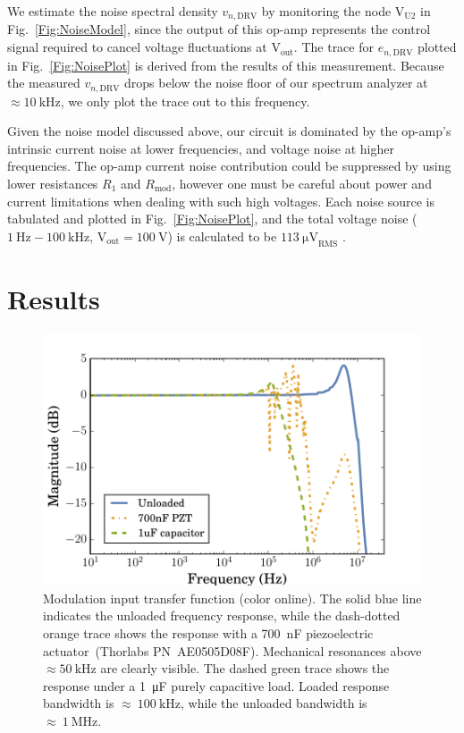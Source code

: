 \documentclass[aip,rsi,reprint]{revtex4-1} %
\begin{document}
We estimate the noise spectral density $v_{n,\text{DRV}}$ by monitoring the node $\text{V}_\text{U2}$ in Fig.~\ref{Fig:NoiseModel}, since the output of this op-amp represents the control signal required to cancel voltage fluctuations at $\text{V}_\text{out}$.
The trace for $e_{n,\text{DRV}}$ plotted in Fig.~\ref{Fig:NoisePlot} is derived from the results of this measurement.
Because the measured $v_{n,\text{DRV}}$ drops below the noise floor of our spectrum analyzer at $\approx \SI{10}{\kilo\hertz}$, we only plot the trace out to this frequency.

Given the noise model discussed above, our circuit is dominated by the op-amp's intrinsic current noise at lower frequencies, and voltage noise at higher frequencies.
The op-amp current noise contribution could be suppressed by using lower resistances $R_1$ and $R_\text{mod}$, however one must be careful about power and current limitations when dealing with such high voltages.
Each noise source is tabulated and plotted in Fig.~\ref{Fig:NoisePlot}, and the total voltage noise ($\SI{1}{\hertz} - \SI{100}{\kilo\hertz}$, $\text{V}_\text{out} = \SI{100}{\volt}$) is calculated to be $\SI{113}{\micro\volt}_\text{RMS}$ .


\section{Results}
\label{Sec:Results}

\begin{figure}[t]
\includegraphics[width=\columnwidth]{PiezoModulationTransfer}
\caption{Modulation input transfer function (color online). The solid blue line indicates the unloaded frequency response, while the dash-dotted orange trace shows the response with a \SI{700}{\nano\farad} piezoelectric actuator~{(Thorlabs PN~AE0505D08F)}. Mechanical resonances above $\approx\SI{50}{\kilo\hertz}$ are clearly visible. The dashed green trace shows the response under a \SI{1}{\micro\farad} purely capacitive load. Loaded response bandwidth is $\approx~\SI{100}{\kilo\hertz}$, while the unloaded bandwidth is $\approx~\SI{1}{\mega\hertz}$.\label{Fig:TransferFunc}}
\end{figure}
\end{document}
